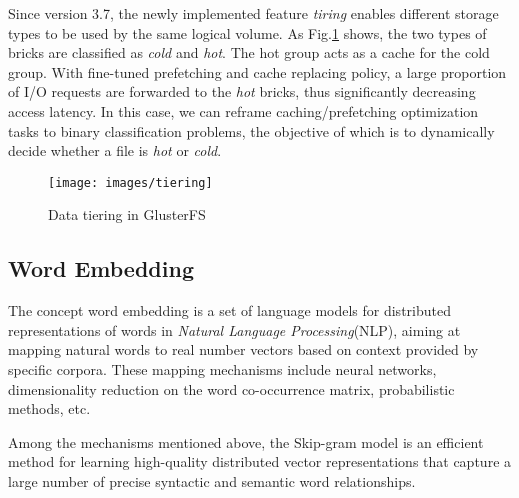 \documentclass[conference]{IEEEtran}
\begin{document}
Since version 3.7, the newly implemented feature \textit{tiring} enables different storage types to be used by the same logical volume. As Fig.\ref{fig:tiering} shows, the two types of bricks are classified as \textit{cold} and \textit{hot}. The hot group acts as a cache for the cold group. With fine-tuned prefetching and cache replacing policy, a large proportion of I/O requests are forwarded to the \textit{hot} bricks, thus significantly decreasing access latency. In this case, we can reframe caching/prefetching optimization tasks to binary classification problems, the objective of which is to dynamically decide whether a file is \textit{hot} or \textit{cold}.

\begin{figure}
\centering
\texttt{[image: images/tiering]}
\caption{Data tiering in GlusterFS}
\label{fig:tiering}
\end{figure}

\subsection{Word Embedding}
The concept word embedding is a set of language models for distributed representations of words in \textit{Natural Language Processing}(NLP), aiming at mapping natural words to real number vectors based on context provided by specific corpora.
These mapping mechanisms include neural networks, dimensionality reduction on the word co-occurrence matrix, probabilistic methods, etc.

Among the mechanisms mentioned above, the Skip-gram model is an efficient method for learning high-quality distributed vector representations that capture a large number of precise syntactic and semantic word relationships.

\end{document}
